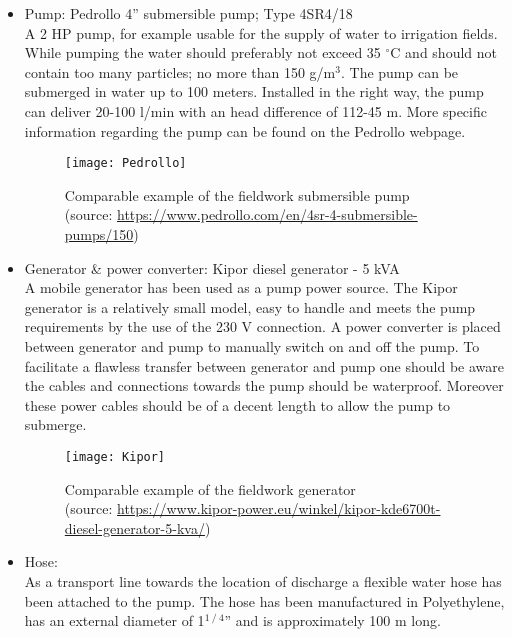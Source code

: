 \begin{itemize}
\item Pump: Pedrollo 4” submersible pump; Type 4SR4/18 \\
A 2 HP pump, for example usable for the supply of water to irrigation fields. While pumping the water should preferably not exceed 35 $^{\circ}$C and should not contain too many particles; no more than 150 g/m$^{3}$. The pump can be submerged in water up to 100 meters. Installed in the right way, the pump can deliver 20-100 l/min with an head difference of 112-45 m. More specific information regarding the pump can be found on the Pedrollo webpage.

\begin{figure}[h!]
 \centering\texttt{[image: Pedrollo]}
 \captionsetup{justification=centering}
 \caption[Comparable example of the fieldwork submersible pump]{Comparable example of the fieldwork submersible pump \\ (source: \url{https://www.pedrollo.com/en/4sr-4-submersible-pumps/150})} 
 \label{fig:Pedrollo}
\end{figure}

\item Generator \& power converter: Kipor diesel generator - 5 kVA \\
A mobile generator has been used as a pump power source. The Kipor generator is a relatively small model, easy to handle and meets the pump requirements by the use of the 230 V connection. A power converter is placed between generator and pump to manually switch on and off the pump. To facilitate a flawless transfer between generator and pump one should be aware the cables and connections towards the pump should be waterproof. Moreover these power cables should be of a decent length to allow the pump to submerge. 

\begin{figure}[h!]
 \centering\texttt{[image: Kipor]}
 \captionsetup{justification=centering}
 \caption[Comparable example of the fieldwork generator]{Comparable example of the fieldwork generator \\ (source: \url{https://www.kipor-power.eu/winkel/kipor-kde6700t-diesel-generator-5-kva/})}
 \label{fig:Kipor}
\end{figure}

\item Hose: \\
As a transport line towards the location of discharge a flexible water hose has been attached to the pump. The hose has been manufactured in Polyethylene, has an external diameter of 1$^{1⁄4}$” and is approximately 100 m long. 


\end{itemize}
